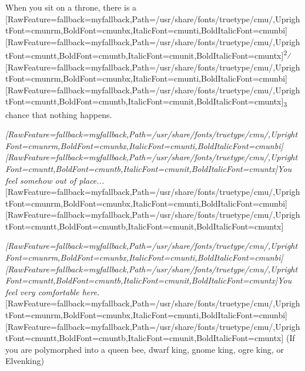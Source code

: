 When you sit on a throne, there is a \allowbreak{}\setmainfont{cmunrm.ttf}[RawFeature={fallback=myfallback},Path=/usr/share/fonts/truetype/cmu/,UprightFont=cmunrm,BoldFont=cmunbx,ItalicFont=cmunti,BoldItalicFont=cmunbi]\setmonofont{cmunrm.ttf}[RawFeature={fallback=myfallback},Path=/usr/share/fonts/truetype/cmu/,UprightFont=cmuntt,BoldFont=cmuntb,ItalicFont=cmunit,BoldItalicFont=cmuntx]\textsuperscript{2}⁄\allowbreak{}\setmainfont{cmunrm.ttf}[RawFeature={fallback=myfallback},Path=/usr/share/fonts/truetype/cmu/,UprightFont=cmunrm,BoldFont=cmunbx,ItalicFont=cmunti,BoldItalicFont=cmunbi]\setmonofont{cmunrm.ttf}[RawFeature={fallback=myfallback},Path=/usr/share/fonts/truetype/cmu/,UprightFont=cmuntt,BoldFont=cmuntb,ItalicFont=cmunit,BoldItalicFont=cmuntx]\textsubscript{3} chance that nothing happens.




\begin{myitemize}\item{}{\itshape \allowbreak{}\setmainfont{cmunti.ttf}[RawFeature={fallback=myfallback},Path=/usr/share/fonts/truetype/cmu/,UprightFont=cmunrm,BoldFont=cmunbx,ItalicFont=cmunti,BoldItalicFont=cmunbi]\setmonofont{cmunti.ttf}[RawFeature={fallback=myfallback},Path=/usr/share/fonts/truetype/cmu/,UprightFont=cmuntt,BoldFont=cmuntb,ItalicFont=cmunit,BoldItalicFont=cmuntx]\itshape {}You feel somehow out of place...}\allowbreak{}\setmainfont{cmunrm.ttf}[RawFeature={fallback=myfallback},Path=/usr/share/fonts/truetype/cmu/,UprightFont=cmunrm,BoldFont=cmunbx,ItalicFont=cmunti,BoldItalicFont=cmunbi]\setmonofont{cmunrm.ttf}[RawFeature={fallback=myfallback},Path=/usr/share/fonts/truetype/cmu/,UprightFont=cmuntt,BoldFont=cmuntb,ItalicFont=cmunit,BoldItalicFont=cmuntx]
\item{}{\itshape \allowbreak{}\setmainfont{cmunti.ttf}[RawFeature={fallback=myfallback},Path=/usr/share/fonts/truetype/cmu/,UprightFont=cmunrm,BoldFont=cmunbx,ItalicFont=cmunti,BoldItalicFont=cmunbi]\setmonofont{cmunti.ttf}[RawFeature={fallback=myfallback},Path=/usr/share/fonts/truetype/cmu/,UprightFont=cmuntt,BoldFont=cmuntb,ItalicFont=cmunit,BoldItalicFont=cmuntx]\itshape {}You feel very comfortable here.}{$\text{ }$}\allowbreak{}\setmainfont{cmunrm.ttf}[RawFeature={fallback=myfallback},Path=/usr/share/fonts/truetype/cmu/,UprightFont=cmunrm,BoldFont=cmunbx,ItalicFont=cmunti,BoldItalicFont=cmunbi]\setmonofont{cmunrm.ttf}[RawFeature={fallback=myfallback},Path=/usr/share/fonts/truetype/cmu/,UprightFont=cmuntt,BoldFont=cmuntb,ItalicFont=cmunit,BoldItalicFont=cmuntx] (If you are polymorphed into a queen bee\footnotemark[44], dwarf king\footnotemark[45], gnome king\footnotemark[46], ogre king\footnotemark[47], or Elvenking\footnotemark[48])
\end{myitemize}


